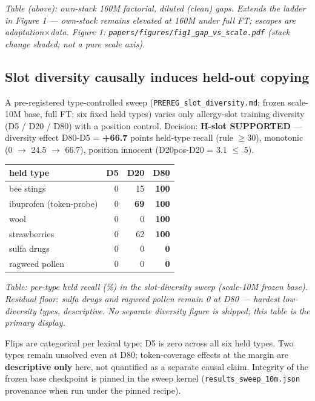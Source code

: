\documentclass[11pt]{article}
\begin{document}
\emph{Table (above): own-stack 160M factorial, diluted (clean) gaps. Extends the ladder in Figure 1 --- own-stack remains elevated at 160M under full FT; escapes are adaptation$\times$data. Figure 1: \texttt{papers/figures/fig1\_gap\_vs\_scale.pdf} (stack change shaded; not a pure scale axis).}

\subsection{Slot diversity causally induces held-out copying}\label{sec:diversity}

A pre-registered type-controlled sweep (\texttt{PREREG\_slot\_diversity.md}; frozen scale-10M base, full FT; six fixed held types) varies only allergy-slot training diversity (D5 / D20 / D80) with a position control. Decision: \textbf{H-slot SUPPORTED} --- diversity effect D80-D5 = \textbf{+66.7} points held-type recall (rule $\ge$30), monotonic (0 $\rightarrow$ 24.5 $\rightarrow$ 66.7), position innocent (\textbar D20pos-D20\textbar{} = 3.1 $\le$ 5).

 \begin{center}
\begin{tabular}{lrrr}
\toprule
held type & D5 & D20 & D80 \\
\midrule
bee stings & 0 & 15 & \textbf{100} \\
ibuprofen (token-probe) & 0 & \textbf{69} & \textbf{100} \\
wool & 0 & 0 & \textbf{100} \\
strawberries & 0 & 62 & \textbf{100} \\
sulfa drugs & 0 & 0 & \textbf{0} \\
ragweed pollen & 0 & 0 & \textbf{0} \\
\bottomrule
\end{tabular}
\end{center}

\emph{Table: per-type held recall (\%) in the slot-diversity sweep (scale-10M frozen base). Residual floor: sulfa drugs and ragweed pollen remain 0 at D80 --- hardest low-diversity types, descriptive. No separate diversity figure is shipped; this table is the primary display.}

Flips are categorical per lexical type; D5 is zero across all six held types. Two types remain unsolved even at D80; token-coverage effects at the margin are \textbf{descriptive only} here, not quantified as a separate causal claim. Integrity of the frozen base checkpoint is pinned in the sweep kernel (\texttt{results\_sweep\_10m.json} provenance when run under the pinned recipe).
\end{document}
